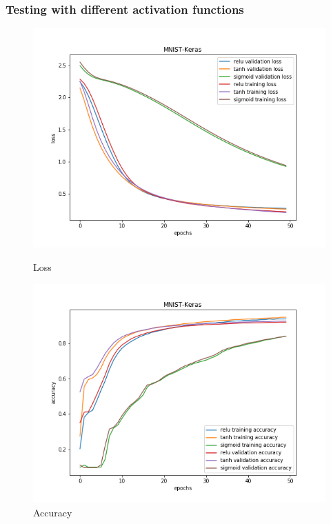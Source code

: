\documentclass{article}
\begin{document}
\pagebreak
\subsubsection{Testing with different activation functions}

\begin{figure}[!htb]
	\includegraphics[width=\linewidth]{../output_plots/part_1_task_4_activations_loss.png}
	\caption{Loss}\label{fig:part_1_task_4_activations_loss}
	\endminipage\hfill
	\includegraphics[width=\linewidth]{../output_plots/part_1_task_4_activations_accuracy.png}
	\caption{Accuracy}\label{fig:part_1_task_4_activations_accuracy}
	\endminipage\hfill
\end{figure}
\end{document}
